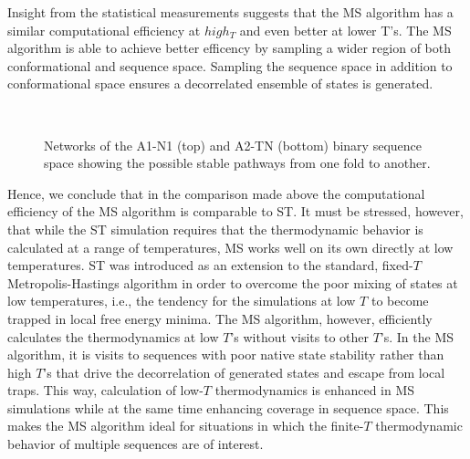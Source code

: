 \documentclass[%
 aip,
rsi,%
 amsmath,amssymb,
 reprint,%
]{revtex4-1}
\begin{document}
Insight from the statistical measurements suggests that the MS algorithm has a similar computational efficiency at $high_T$ and even better at lower T's. The MS algorithm is able to achieve  better efficency by sampling a wider region of both conformational and sequence space. Sampling the sequence space in addition to conformational space ensures a decorrelated ensemble of states is generated.

\begin{figure}
\\
\caption{Networks of the A1-N1 (top) and A2-TN (bottom) binary sequence space showing the possible stable pathways from one fold to another. }
\end{figure}

Hence, we conclude that in the comparison made above the computational efficiency of the MS algorithm is comparable to ST. It must be stressed, however, that while the ST simulation requires that the thermodynamic behavior is calculated at a range of temperatures, MS works well on its own directly at low temperatures. ST was introduced as an extension to the standard, fixed-$T$ Metropolis-Hastings algorithm in order to overcome the poor mixing of states at low temperatures, i.e., the tendency for the simulations at low $T$ to become trapped in local free energy minima. The MS algorithm, however, efficiently calculates the thermodynamics at low $T$'s without visits to other $T$'s. In the MS algorithm, it is visits to sequences with poor native state stability rather than high $T$'s that drive the decorrelation of generated states and escape from local traps. This way, calculation of low-$T$ thermodynamics is enhanced in MS simulations while at the same time enhancing coverage in sequence space. This makes the MS algorithm ideal for situations in which the finite-$T$ thermodynamic behavior of multiple sequences are of interest. 

\vspace{12pt}
\end{document}
